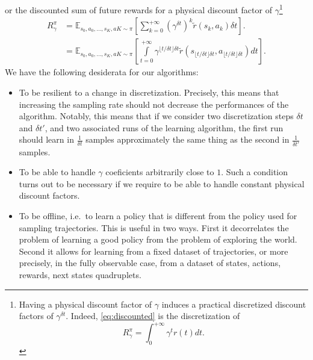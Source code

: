 \documentclass[11pt]{article}
\newcommand{\deltat}{{\delta t}}
\newcommand{\E}{\mathbb{E}}
\begin{document}
or the discounted sum of future rewards for a physical discount factor of $\gamma$\footnote{
	Having a physical discount factor of $\gamma$ induces a practical discretized discount
	factors of $\gamma^\deltat$. Indeed, \eqref{eq:discounted} is the discretization of
	\begin{equation}
		R^\pi_\gamma = \int_{0}^{+\infty} \gamma^{t} r(t) dt.
		\label{eq:discounted}
	\end{equation}
}
\begin{align}
	R^\pi_\gamma &= \E_{s_0, a_0, \ldots, s_K, aK \sim \pi}
	\left[
		\sum\limits_{k=0}^{+\infty}
		(\gamma^\deltat)^k \tilde{r}(s_k, a_k)\deltat 
                       \right].\\
                     &= \E_{s_0, a_0, \ldots, s_K, aK \sim \pi}
	\left[
		\int\limits_{t=0}^{+\infty}
		\gamma^{\lfloor t/\deltat\rfloor \deltat} \tilde{r}(s_{\lfloor t/\deltat\rfloor\deltat}, a_{\lfloor t/\deltat \rfloor\deltat})dt 
	\right].
\end{align}
We have the following desiderata for our algorithms:
\begin{itemize}
	\item To be resilient to a change in discretization. Precisely, this
		means that increasing the sampling rate should not decrease the
		performances of the algorithm. Notably, this means that if we consider
		two discretization steps $\deltat$ and $\deltat'$, and two associated
		runs of the learning algorithm, the first run should learn in $\frac{1}{\deltat}$
		samples approximately the same thing as the second in $\frac{1}{\deltat'}$ samples.
	\item To be able to handle $\gamma$ coeficients arbitrarily close to $1$.
		Such a condition turns out to be necessary if we require to
		be able to handle constant physical discount factors.
	\item To be offline, i.e.\ to learn a policy that is different from
		the policy used for sampling trajectories. This is useful in
		two ways. First it decorrelates the problem of learning a good
		policy from the problem of exploring the world. Second it
		allows for learning from a fixed dataset of trajectories, or more
		precisely, in the fully observable case, from a dataset of
		states, actions, rewards, next states quadruplets.
\end{itemize}
\end{document}
